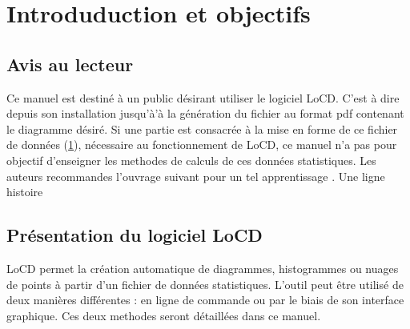 \chapter{Introduduction et objectifs}\label{chap:fichDonnees}
\section{Avis au lecteur} 
Ce manuel est destiné à un public désirant utiliser le logiciel LoCD. C'est à dire depuis son installation jusqu'à'à la génération du fichier au format pdf contenant le diagramme désiré. Si une partie est consacrée à la mise en forme de ce fichier de données (\ref{chap:fichDonnees}), nécessaire au fonctionnement de LoCD, ce manuel n'a pas pour objectif d'enseigner les methodes de calculs de ces données statistiques. Les auteurs recommandes l'ouvrage suivant pour un tel apprentissage \cite{stat}. 
Une ligne histoire

\section{Présentation du logiciel LoCD}
LoCD permet la création automatique de diagrammes, histogrammes ou nuages de points à partir d'un fichier de données statistiques.  L'outil peut être utilisé de deux manières différentes : en ligne de commande ou par le biais de son interface graphique. Ces deux methodes seront détaillées dans ce manuel. 
